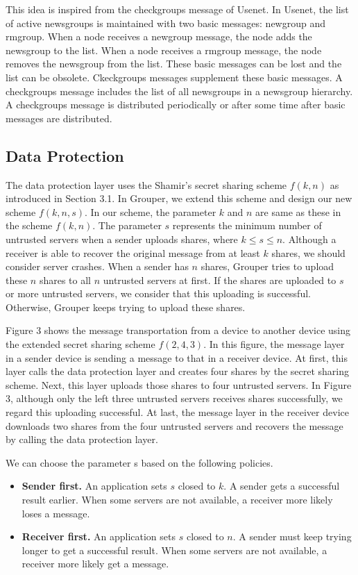 This idea is inspired from the checkgroups message of Usenet\cite{usenet}.
In Usenet, the list of active newsgroups is maintained with two basic messages: newgroup and rmgroup.
When a node receives a newgroup message, the node adds the newsgroup to the list.
When a node receives a rmgroup message, the node removes the newsgroup from the list.
These basic messages can be lost and the list can be obsolete.
Ckeckgroups messages supplement these basic messages.
A checkgroups message includes the list of all newsgroups in a newsgroup hierarchy.
A checkgroups message is distributed periodically or after some time after basic messages are distributed.

\subsection{Data Protection}

The data protection layer uses the Shamir's secret sharing scheme $f(k, n)$ as introduced in Section 3.1.
In Grouper, we extend this scheme and design our new scheme $ f(k, n, s)$.
In our scheme, the parameter $k$ and $n$ are same as these in the scheme $f(k, n)$. 
The  parameter $s$ represents the minimum number of untrusted servers when a sender uploads shares, where $k \leq s \leq n$.
Although a receiver is able to recover the original message from at least $k$ shares, we should consider server crashes. 
When a sender has $n$ shares, Grouper tries to upload these $n$ shares to all $n$ untrusted servers at first. 
If the shares are uploaded to $s$ or more untrusted servers, we consider that this uploading is successful.
Otherwise, Grouper keeps trying to upload these shares.

Figure 3 shows the message transportation from a device to another device using the extended secret sharing scheme $f(2, 4, 3)$.
In this figure, the message layer in a sender device is sending a message to that in a receiver device.
At first, this layer calls the data protection layer and creates four shares by the secret sharing scheme.
Next, this layer uploads those shares to four untrusted servers.
In Figure 3, although only the left three untrusted servers receives shares successfully, we regard this uploading successful.
At last, the message layer in the receiver device downloads two shares from the four untrusted servers and recovers the message by calling the data protection layer.

We can choose the parameter s based on the following policies.

\begin{itemize}
	\setlength{\itemsep}{1pt}
	\setlength{\parskip}{0pt}
	\setlength{\parsep}{0pt}
	\item \textbf{Sender first.} 
	An application sets $s$ closed to $k$. 
	A sender gets a successful result earlier.
	When some servers are not available, a receiver more likely loses a message.
	\item \textbf{Receiver first.}
	An application sets $s$ closed to $n$. 
	A sender must keep trying longer to get a successful result.
	When some servers are not available, a receiver more likely get a message.
\end{itemize}

